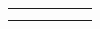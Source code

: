 {\begin{center}
\begin{xtabular*}{\mytablewidth}[t]{|p{10\mystarwidth}|p{10\mystarwidth}|p{10\mystarwidth}|p{10\mystarwidth}|p{10\mystarwidth}|p{10\mystarwidth}|}
         &
    
    
         &
    
    
     \tabularnewline{}
    
    
         &
    
    
         &
    
    
         &
    
    
         &
    
    
         &
    
    
     \tabularnewline{}
    

\end{xtabular*}
\end{center}}
